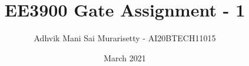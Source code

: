 \documentclass[journal,12pt,twocolumn]{IEEEtran}
\date{March 2021}
\DeclareMathOperator*{\Res}{Res}
\begin{document}
\newcommand{\BEQA}{\begin{eqnarray}}
\newcommand{\EEQA}{\end{eqnarray}}
\newcommand{\define}{\stackrel{\triangle}{=}}

\raggedbottom
\setlength{\parindent}{0pt}
\providecommand{\mbf}{\mathbf}
\providecommand{\pr}[1]{\ensuremath{\Pr\left(#1\right)}}
\providecommand{\qfunc}[1]{\ensuremath{Q\left(#1\right)}}
\providecommand{\fn}[1]{\ensuremath{f\left({#1}\right)}}
\providecommand{\e}[1]{\ensuremath{E\left(#1\right)}}
\providecommand{\sbrak}[1]{\ensuremath{{}\left[#1\right]}}
\providecommand{\lsbrak}[1]{\ensuremath{{}\left[#1\right.}}
\providecommand{\rsbrak}[1]{\ensuremath{{}\left.#1\right]}}
\providecommand{\brak}[1]{\ensuremath{\left(#1\right)}}
\providecommand{\lbrak}[1]{\ensuremath{\left(#1\right.}}
\providecommand{\rbrak}[1]{\ensuremath{\left.#1\right)}}
\providecommand{\cbrak}[1]{\ensuremath{\left\{#1\right\}}}
\providecommand{\lcbrak}[1]{\ensuremath{\left\{#1\right.}}
\providecommand{\rcbrak}[1]{\ensuremath{\left.#1\right\}}}
\theoremstyle{remark}
\newtheorem{rem}{Remark}
\newcommand{\sgn}{\mathop{\mathrm{sgn}}}
\newcommand{\comb}[2]{{}^{#1}\mathrm{C}_{#2}}
\providecommand{\abs}[1]{\vert#1\vert}
\providecommand{\res}[1]{\Res\displaylimits_{#1}} 
\providecommand{\norm}[1]{\lVert#1\rVert}
\providecommand{\mtx}[1]{\mathbf{#1}}
\providecommand{\mean}[1]{E\sbrak{ #1 }}
\providecommand{\fourier}{\overset{\mathcal{F}}{ \rightleftharpoons}}
\providecommand{\system}{\overset{\mathcal{H}}{ \longleftrightarrow}}
\newcommand{\solution}{\noindent \textbf{Solution: }}
\newcommand{\cosec}{\,\text{cosec}\,}
\providecommand{\dec}[2]{\ensuremath{\overset{#1}{\underset{#2}{\gtrless}}}}
\newcommand{\myvec}[1]{\ensuremath{\begin{pmatrix}#1\end{pmatrix}}}
\newcommand{\mydet}[1]{\ensuremath{\begin{vmatrix}#1\end{vmatrix}}}
\makeatletter
\vspace{3cm}
\title{EE3900 Gate Assignment - 1}
\author{Adhvik Mani Sai Murarisetty - AI20BTECH11015}
\maketitle
\newpage
\bigskip
\renewcommand{\thetable}{\theenumi}
\end{document}
